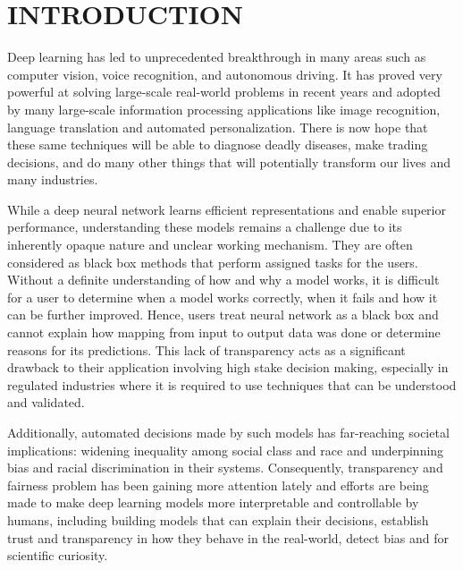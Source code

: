 %
%
\chapter{INTRODUCTION}
\thispagestyle{empty}


Deep learning has led to unprecedented breakthrough in many areas such as computer vision, voice recognition, and autonomous driving.  It has proved very powerful at solving large-scale real-world problems in recent years and adopted by many large-scale information processing applications like image recognition, language translation and automated personalization. There is now hope that these same techniques will be able to diagnose deadly diseases,  make trading decisions, and do many other things that will potentially transform our lives and many industries. 

While a deep neural network learns efficient representations and enable superior performance, understanding these models remains a challenge due to its inherently opaque nature and unclear working mechanism. They are often considered as black box methods that perform assigned tasks for the users. Without a definite understanding of how and why a model works, it is difficult for a user to determine when a model works correctly, when it fails and how it can be further improved. Hence, users treat neural network as a black box and cannot explain how mapping from input to output data was done or determine reasons for its predictions. This lack of transparency acts as a significant drawback to their application involving high stake decision making, especially in regulated industries where it is required to use techniques that can be understood and validated.

Additionally, automated decisions made by such models has far-reaching societal implications: widening inequality among social class and race and underpinning bias and racial discrimination in their systems. Consequently, transparency and fairness problem has been gaining more attention lately and efforts are being made to make deep learning models more interpretable and controllable by humans, including building models that can explain their decisions, establish trust and transparency in how they behave in the real-world, detect bias and for scientific curiosity.

